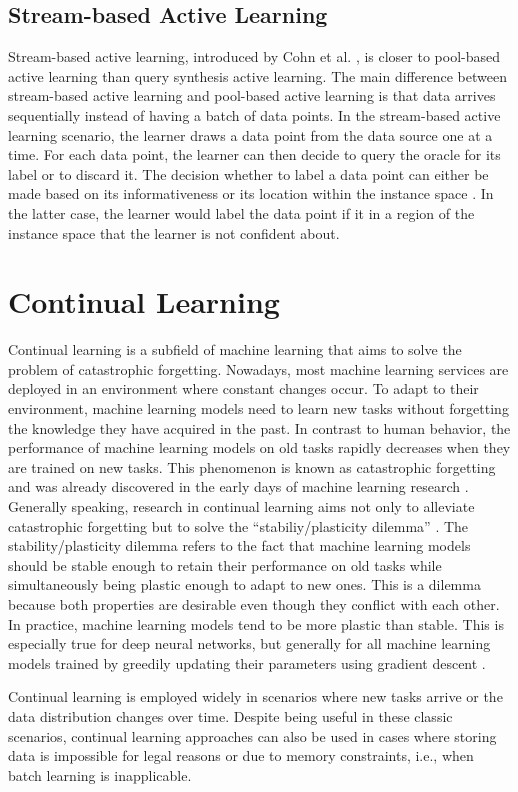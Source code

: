 \subsection{Stream-based Active Learning}
\label{sec:StreamBasedActiveLearning}
Stream-based active learning, introduced by Cohn et al. \cite{cohn1994improving}, is closer to pool-based active learning than query synthesis
active learning. The main difference between stream-based active learning and pool-based active learning is that data arrives sequentially
instead of having a batch of data points. In the stream-based active learning scenario, the learner draws a data point from the data source
one at a time. For each data point, the learner can then decide to query the oracle for its label or to discard it. The decision whether to label a
data point can either be made based on its informativeness \cite{dagan1995committee} or its location within the instance space \cite{cohn1994improving}.
In the latter case, the learner would label the data point if it in a region of the instance space that the learner is not confident about.

\section{Continual Learning}
\label{sec:ContinualLearning}
Continual learning is a subfield of machine learning that aims to solve the problem of catastrophic forgetting. Nowadays, most machine learning services are deployed
in an environment where constant changes occur. To adapt to their environment, machine learning models need to learn new tasks without forgetting the knowledge
they have acquired in the past. In contrast to human behavior, the performance of machine learning models on old tasks rapidly decreases when they are trained
on new tasks. This phenomenon is known as catastrophic forgetting and was already discovered in the early days of machine learning research \cite{mccloskey1989catastrophic}.
Generally speaking, research in continual learning aims not only to alleviate catastrophic forgetting but to solve the 
\enquote{stabiliy/plasticity dilemma} \cite{carpenter1988art}. The stability/plasticity dilemma refers to the fact that machine learning models
should be stable enough to retain their performance on old tasks while simultaneously being plastic enough to adapt to new ones. This is a dilemma
because both properties are desirable even though they conflict with each other. In practice, machine learning models tend to be more plastic than stable.
This is especially true for deep neural networks, but generally for all machine learning models trained by greedily updating their parameters using
gradient descent \cite{mundt2020wholistic}. \par
Continual learning is employed widely in scenarios where new tasks arrive or the data distribution changes over time. Despite being useful
in these classic scenarios, continual learning approaches can also be used in cases where storing data is impossible for legal reasons or due to memory
constraints, i.e., when batch learning is inapplicable. 


